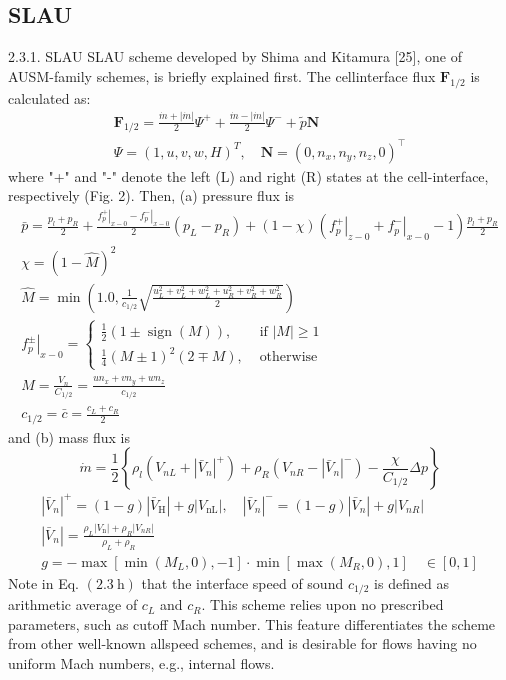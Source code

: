 \subsection{SLAU}

2.3.1. SLAU SLAU scheme developed by Shima and Kitamura [25], one of AUSM-family schemes, is briefly explained first. The cellinterface flux $\mathbf{F}_{1 / 2}$ is calculated as:
$$
\begin{array}{l}
\mathbf{F}_{1 / 2}=\frac{\dot{m}+|\dot{m}|}{2} \Psi^{+}+\frac{\dot{m}-|\dot{m}|}{2} \Psi^{-}+\tilde{p} \mathbf{N} \\
\Psi=(1, u, v, w, H)^{T}, \quad \mathbf{N}=\left(0, n_{x}, n_{y}, n_{z}, 0\right)^{\top}
\end{array}
$$
where "+" and "-" denote the left (L) and right (R) states at the cell-interface, respectively (Fig. 2). Then, (a) pressure flux is
$$
\begin{array}{l}
\bar{p}=\frac{p_{l}+p_{R}}{2}+\frac{\left.f_{p}^{+}\right|_{x-0}-\left.f_{p}^{-}\right|_{x-0}}{2}\left(p_{L}-p_{R}\right)+(1-\chi)\left(\left.f_{p}^{+}\right|_{z-0}+\left.f_{p}^{-}\right|_{x-0}-1\right) \frac{p_{l}+p_{R}}{2} \\
\chi=(1-\hat{M})^{2} \\
\hat{M}=\min \left(1.0, \frac{1}{c_{1 / 2}} \sqrt{\frac{u_{L}^{2}+v_{L}^{2}+w_{L}^{2}+u_{R}^{2}+v_{R}^{2}+w_{R}^{2}}{2}}\right) \\
\left.f_{p}^{\pm}\right|_{x-0}=\left\{\begin{array}{ll}
\frac{1}{2}(1 \pm \operatorname{sign}(M)), & \text { if }|M| \geqslant 1 \\
\frac{1}{4}(M \pm 1)^{2}(2 \mp M), & \text { otherwise }
\end{array}\right. \\
M=\frac{V_{n}}{C_{1 / 2}}=\frac{u n_{x}+v n_{y}+w n_{z}}{c_{1 / 2}} \\
c_{1 / 2}=\bar{c}=\frac{c_{L}+c_{R}}{2}
\end{array}
$$
and (b) mass flux is
$$
\dot{m}=\frac{1}{2}\left\{\rho_{l}\left(V_{n L}+\left|\bar{V}_{n}\right|^{+}\right)+\rho_{R}\left(V_{n R}-\left|\bar{V}_{n}\right|^{-}\right)-\frac{\chi}{C_{1 / 2}} \Delta p\right\}
$$
$$
\begin{array}{l}
\left|\bar{V}_{n}\right|^{+}=(1-g)\left|\bar{V}_{\mathrm{H}}\right|+g\left|V_{\mathrm{nL}}\right|, \quad\left|\bar{V}_{n}\right|^{-}=(1-g)\left|\bar{V}_{n}\right|+g\left|V_{n R}\right| \\
\left|\bar{V}_{n}\right|=\frac{\rho_{L}\left|V_{\mathrm{n}}\right|+\rho_{R}\left|V_{n R}\right|}{\rho_{L}+\rho_{R}} \\
g=-\max \left[\min \left(M_{L}, 0\right),-1\right] \cdot \min \left[\max \left(M_{R}, 0\right), 1\right] \quad \in[0,1]
\end{array}
$$
Note in Eq. $(2.3 \mathrm{~h})$ that the interface speed of sound $c_{1 / 2}$ is defined as arithmetic average of $c_{L}$ and $c_{R}$. This scheme relies upon no prescribed parameters, such as cutoff Mach number. This feature differentiates the scheme from other well-known allspeed schemes, and is desirable for flows having no uniform Mach numbers, e.g., internal flows.

